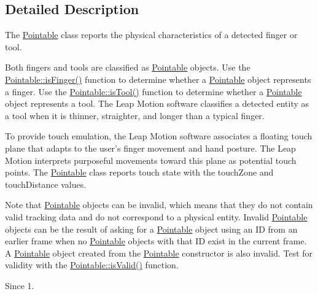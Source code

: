\subsection{Detailed Description}
The \hyperlink{class_leap_1_1_pointable}{Pointable} class reports the physical characteristics of a detected finger or tool.

Both fingers and tools are classified as \hyperlink{class_leap_1_1_pointable}{Pointable} objects. Use the \hyperlink{class_leap_1_1_pointable_acb22151412f46b6be8b773986452eba8}{Pointable\+::is\+Finger()} function to determine whether a \hyperlink{class_leap_1_1_pointable}{Pointable} object represents a finger. Use the \hyperlink{class_leap_1_1_pointable_ac10f09626b790dd5867411748242c437}{Pointable\+::is\+Tool()} function to determine whether a \hyperlink{class_leap_1_1_pointable}{Pointable} object represents a tool. The Leap Motion software classifies a detected entity as a tool when it is thinner, straighter, and longer than a typical finger.

To provide touch emulation, the Leap Motion software associates a floating touch plane that adapts to the user's finger movement and hand posture. The Leap Motion interprets purposeful movements toward this plane as potential touch points. The \hyperlink{class_leap_1_1_pointable}{Pointable} class reports touch state with the touch\+Zone and touch\+Distance values.

Note that \hyperlink{class_leap_1_1_pointable}{Pointable} objects can be invalid, which means that they do not contain valid tracking data and do not correspond to a physical entity. Invalid \hyperlink{class_leap_1_1_pointable}{Pointable} objects can be the result of asking for a \hyperlink{class_leap_1_1_pointable}{Pointable} object using an I\+D from an earlier frame when no \hyperlink{class_leap_1_1_pointable}{Pointable} objects with that I\+D exist in the current frame. A \hyperlink{class_leap_1_1_pointable}{Pointable} object created from the \hyperlink{class_leap_1_1_pointable}{Pointable} constructor is also invalid. Test for validity with the \hyperlink{class_leap_1_1_pointable_a124f21a619df4fb338d1ce8a7a6d3341}{Pointable\+::is\+Valid()} function.

\begin{DoxySince}{Since}
1. 
\end{DoxySince}


